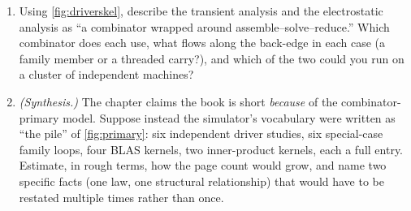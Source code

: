 \begin{enumerate}[nosep]
   as a -style  whose step discards its
  accumulator. Then argue from your rewrite why a map parallelizes and a fold does
  not---i.e., which data dependence the discarded carry would have introduced.
  \item Using \cref{fig:driverskel}, describe the transient analysis and the
  electrostatic analysis as ``a combinator wrapped around assemble--solve--reduce.''
  Which combinator does each use, what flows along the back-edge in each case (a
  family member or a threaded carry?), and which of the two could you run on a
  cluster of independent machines?
  \item \emph{(Synthesis.)} The chapter claims the book is short \emph{because} of
  the combinator-primary model. Suppose instead the simulator's vocabulary were
  written as ``the pile'' of \cref{fig:primary}: six independent driver studies,
  six special-case family loops, four BLAS kernels, two inner-product kernels, each
  a full entry. Estimate, in rough terms, how the page count would grow, and name
  two specific facts (one law, one structural relationship) that would have to be
  restated multiple times rather than once.
\end{enumerate}
